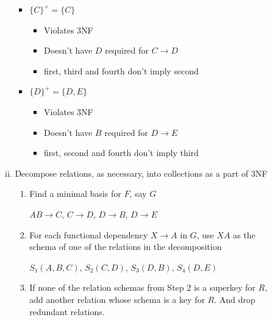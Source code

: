 \documentclass[12pt]{article}
\begin{document}
\begin{enumerate}[1.]
\begin{enumerate}[a)]
\begin{enumerate}[i)]
\begin{itemize}
                \item $\{C\}^+ = \{C\}$
                \begin{itemize}
                    \item Violates 3NF
                    \item Doesn't have $D$ required for $C \to D$
                    \item first, third and fourth don't imply second
                \end{itemize}

                \item $\{D\}^+ = \{D,E\}$
                \begin{itemize}
                    \item Violates 3NF
                    \item Doesn't have $B$ required for $D \to E$
                    \item first, second and fourth don't imply third
                \end{itemize}
            \end{itemize}
            \color{black}

            \item Decompose relations, as necessary, into collections as a part of 3NF

            \bigskip

            \begin{enumerate}[1.]
                \item Find a minimal basis for $F$, say $G$

                \bigskip

                \color{red}
                $AB \to C$, $C \to D$, $D \to B$, $D \to E$
                \color{black}

                \bigskip

                \item For each functional dependency $X \to A$ in $G$, use $XA$
                as the schema of one of the relations in the decomposition

                \bigskip

                \color{red}
                $S_1(A,B,C)$, $S_2(C,D)$, $S_3(D,B)$, $S_4(D,E)$
                \color{black}

                \bigskip

                \item If none of the relation schemas from Step 2 is a superkey for $R$,
                add another relation whose schema is a key for $R$. And drop redundant relations.


\end{enumerate}
\end{enumerate}
\end{enumerate}
\end{enumerate}
\end{document}
